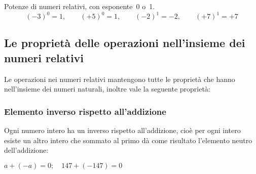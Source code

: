  \begin{exrig}
 \begin{esempio}
 Potenze di numeri relativi, con esponente~0 o~1.
\[(-3)^0=1,\qquad (+5)^0=1, \qquad (-2)^1=-2, \qquad (+7)^1=+7 \]
 \end{esempio}

\end{exrig}


\subsection{Le proprietà delle operazioni nell'insieme dei numeri relativi}

Le operazioni nei numeri relativi mantengono tutte le proprietà che hanno 
nell'insieme dei numeri naturali, inoltre vale la seguente proprietà:

\subsubsection{Elemento inverso rispetto all'addizione}

Ogni numero intero ha un inverso rispetto all'addizione, cioè per ogni intero 
esiste un altro intero che sommato al primo dà come risultato l'elemento neutro 
dell'addizione:

\(a + (-a) = 0; \quad 147 + (-147) = 0\)

